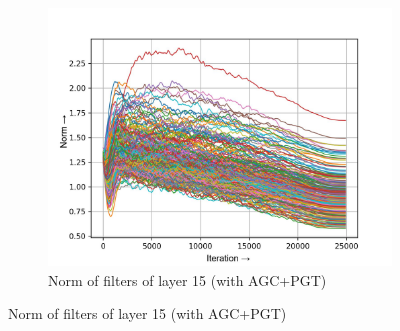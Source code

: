 \documentclass[times,sort&compress]{elsarticle}
\begin{document}
\begin{figure}[t]
\begin{subfigure}[t]{0.32\textwidth}
\includegraphics[width=\linewidth]{agc_pgt-w-layer-5-3}
\caption{Norm of filters of layer 15 (with AGC+PGT)}
\end{subfigure}


\end{figure}
\end{document}
